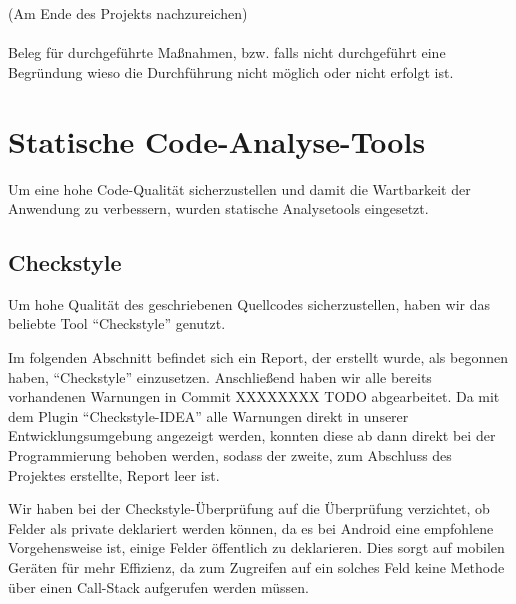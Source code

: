 
    (Am Ende des Projekts nachzureichen)\\\\
    Beleg für durchgeführte Maßnahmen, bzw. falls nicht durchgeführt eine Begründung wieso die Durchführung nicht möglich oder nicht erfolgt ist. \\



\clearpage


\section{Statische Code-Analyse-Tools}

Um eine hohe Code-Qualität sicherzustellen und damit die Wartbarkeit der
Anwendung zu verbessern, wurden statische Analysetools eingesetzt.

\clearpage
\subsection{Checkstyle}

Um hohe Qualität des geschriebenen Quellcodes sicherzustellen, haben wir das beliebte Tool ``Checkstyle'' genutzt.

Im folgenden Abschnitt befindet sich ein Report, der erstellt wurde, als begonnen haben, ``Checkstyle'' einzusetzen. Anschließend haben wir alle bereits vorhandenen Warnungen in Commit XXXXXXXX TODO abgearbeitet. Da mit dem Plugin ``Checkstyle-IDEA'' alle Warnungen direkt in unserer Entwicklungsumgebung angezeigt werden, konnten diese ab dann direkt bei der Programmierung behoben werden, sodass der zweite, zum Abschluss des Projektes erstellte, Report leer ist.

Wir haben bei der Checkstyle-Überprüfung auf die Überprüfung verzichtet, ob Felder als private deklariert werden können, da es bei Android eine empfohlene Vorgehensweise ist, einige Felder öffentlich zu deklarieren. Dies sorgt auf mobilen Geräten für mehr Effizienz, da zum Zugreifen auf ein solches Feld keine Methode über einen Call-Stack aufgerufen werden müssen.






